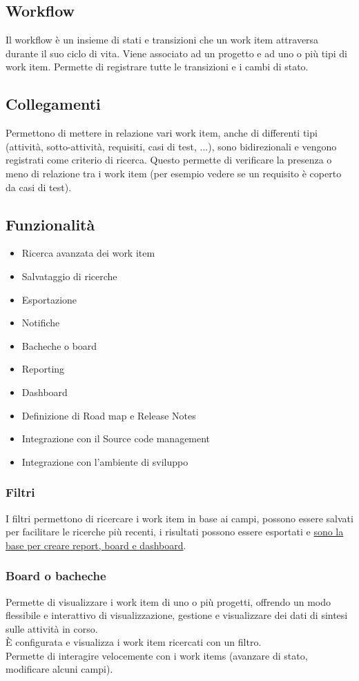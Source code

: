 \documentclass[10pt, a4paper]{article}
\begin{document}
\subsection{Workflow}
Il workflow è un insieme di stati e transizioni che un work item attraversa durante il suo ciclo di vita. Viene associato ad un progetto e ad uno o più tipi di work item. Permette di registrare tutte le transizioni e i cambi di stato.

\subsection{Collegamenti}
Permettono di mettere in relazione vari work item, anche di differenti tipi (attività, sotto-attività, requisiti, casi di test, ...), sono bidirezionali e vengono registrati come criterio di ricerca. Questo permette di verificare la presenza o meno di relazione tra i work item (per esempio vedere se un requisito è coperto da casi di test).

\subsection{Funzionalità}
\begin{itemize}
\item Ricerca avanzata dei work item
\item Salvataggio di ricerche
\item Esportazione
\item Notifiche
\item Bacheche o board
\item Reporting
\item Dashboard
\item Definizione di Road map e Release Notes
\item Integrazione con il Source code management
\item Integrazione con l’ambiente di sviluppo
\end{itemize}

\subsubsection*{Filtri}
I filtri permettono di ricercare i work item in base ai campi, possono essere salvati per facilitare le ricerche più recenti, i risultati possono essere esportati e \underline{sono la base per creare report, board e dashboard}.

\subsubsection*{Board o bacheche}
Permette di visualizzare i work item di uno o più progetti, offrendo un modo flessibile e interattivo di visualizzazione, gestione e visualizzare dei dati di sintesi sulle attività in corso.\\
È configurata e visualizza i work item ricercati con un filtro.\\
Permette di interagire velocemente con i work items (avanzare di stato, modificare alcuni campi).
\end{document}
